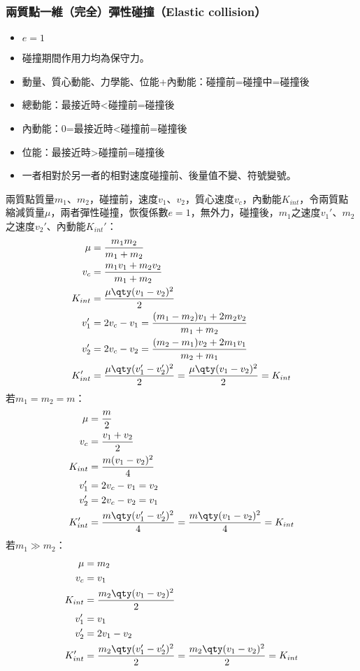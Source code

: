 \documentclass[a4paper,12pt]{article}
\begin{document}
\subsubsection{兩質點一維（完全）彈性碰撞（Elastic collision）}
\begin{itemize}
\item $e=1$
\item 碰撞期間作用力均為保守力。
\item 動量、質心動能、力學能、位能+內動能：碰撞前=碰撞中=碰撞後
\item 總動能：最接近時<碰撞前=碰撞後
\item 內動能：0=最接近時<碰撞前=碰撞後
\item 位能：最接近時>碰撞前=碰撞後
\item 一者相對於另一者的相對速度碰撞前、後量值不變、符號變號。
\end{itemize}
兩質點質量$m_1$、$m_2$，碰撞前，速度$v_1$、$v_2$，質心速度$v_c$，內動能$K_{int}$，令兩質點縮減質量$\mu$，兩者彈性碰撞，恢復係數$e=1$，無外力，碰撞後，$m_1$之速度$v_1'$、$m_2$之速度$v_2'$、內動能$K_{int}'$：
\[\begin{aligned}
\mu&=\frac{m_1m_2}{m_1+m_2}\\
v_c &= \frac{m_1v_1+m_2v_2}{m_1+m_2} \\
K_{int} &= \frac{\mu\qty(v_1-v_2)^2}{2}\\
v_1' &= 2v_c - v_1 = \frac{(m_1-m_2)v_1+2m_2v_2}{m_1+m_2} \\
v_2' &= 2v_c - v_2 = \frac{(m_2-m_1)v_2+2m_1v_1}{m_2+m_1} \\
K_{int}' &= \frac{\mu \qty(v_1'-v_2')^2}{2} = \frac{\mu \qty(v_1-v_2)^2}{2} = K_{int}
\end{aligned}\]
若$m_1=m_2=m$：
\[\begin{aligned}
\mu&=\frac{m}{2}\\
v_c &= \frac{v_1+v_2}{2} \\
K_{int} &= \frac{m(v_1-v_2)^2}{4}\\
v_1' &= 2v_c - v_1 = v_2 \\
v_2' &= 2v_c - v_2 = v_1 \\
K_{int}' &= \frac{m\qty(v_1'-v_2')^2}{4} = \frac{m\qty(v_1-v_2)^2}{4} = K_{int}
\end{aligned}\]
若$m_1\gg m_2$：
\[\begin{aligned}
\mu&=m_2\\
v_c &= v_1 \\
K_{int} &= \frac{m_2\qty(v_1-v_2)^2}{2}\\
v_1' &= v_1 \\
v_2' &= 2v_1 - v_2 \\
K_{int}' &= \frac{m_2\qty(v_1'-v_2')^2}{2} = \frac{m_2\qty(v_1-v_2)^2}{2} = K_{int}
\end{aligned}\]
\end{document}
